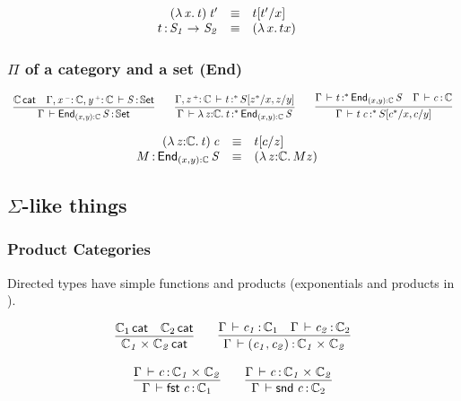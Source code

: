 \documentclass[11pt]{article}
\theoremstyle{plain}
\begin{document}
\[
\begin{array}{rcll}
\mathit{({\lambda\,x.\,t}) \: t'} & \equiv & t [ t' / x ] \\
t \, \mathit{:} \, \mathit{S_1}\rightarrow_{\mathit{}} \mathit{S_2} & \equiv & {({\lambda\,x.\,t}{x})} &
\end{array} \\
\]

\subsubsection{$\Pi$ of a category and a set (End)}

\[
\begin{array}{c}
\infer{\ofdtp{\Gamma}{\picat{(x,y)}{\C}{S}}{\types}}
      {\wfdtp{\C} &
        \ofdtp{\Gamma,\vtptm{x}{\con}{\C},\vtptm{y}{\co}{\C}}{S}{\types}}
\qquad
\infer{\oftpe{\Gamma}{\lam{z}{\C}{t}}{\vcond}{\picat {(x,y)} \C S}}
      {\oftpe{\Gamma,\vtptm{z}{\co}{\C}}{t}{\vcond}{\tsubst{S}{z^*/x,z/y}}}
\qquad
\infer{\oftpe{\Gamma}{\app t {c}}{\vcond}{\tsubst S {c^*/x,c/y}}}
      {\oftpe{\Gamma}{t}{\vcond}{\picat{(x,y)}{\C}{S}} &
        \ofdtp{\Gamma}{c}{\C}}
\end{array}
\]

\[
\begin{array}{rcll}
\mathit{({\lambda\,z \mathit{:} \mathbb{C}.\,t}) \: c} & \equiv & t [ c / z ] \\
M \, \mathit{:} \, \textnormal{\ensuremath{\mathsf{End}}}_{(x,y) \mathit{:} \mathbb{C}} \,\mathit{S} & \equiv & {({\lambda\,z \mathit{:} \mathbb{C}.\,M}{z})} &
\end{array} \\
\]

\subsection{$\Sigma$-like things}

\subsubsection{Product Categories}

Directed types have simple functions and products (exponentials and
products in \Cat).


\[
\begin{array}{c}
\infer{\wfdtp{\prd{\C_1}{\C_2}}}
      {\wfdtp{\C_1} &
        \wfdtp{\C_2}}
\qquad
\infer{\ofdtp{\Gamma}{\pair{c_1}{c_2}}{\prd {\C_1} {\C_2}}}
      {\ofdtp{\Gamma}{c_1}{\C_1} &
       \ofdtp{\Gamma}{c_2}{\C_2}}
\\ \\
\infer{\ofdtp{\Gamma}{\fst c}{\C_1}}
      {\ofdtp{\Gamma}{c}{\prd{\C_1}{\C_2}}}
\qquad
\infer{\ofdtp{\Gamma}{\snd c}{\C_2}}
      {\ofdtp{\Gamma}{c}{\prd{\C_1}{\C_2}}}
\end{array}
\]
\end{document}
